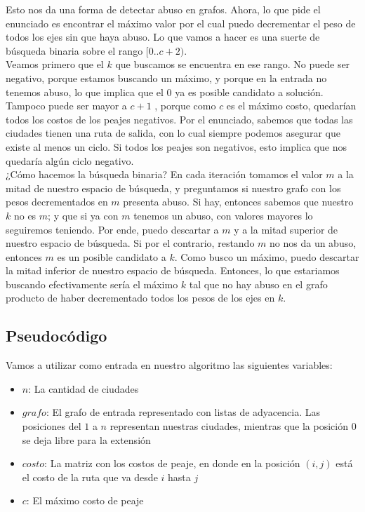 Esto nos da una forma de detectar abuso en grafos. Ahora, lo que pide el enunciado es encontrar el máximo valor por el cual puedo decrementar el peso de todos los ejes sin que haya abuso. Lo que vamos a hacer es una suerte de búsqueda binaria sobre el rango $[0..c+2)$. \\

Veamos primero que el $k$ que buscamos se encuentra en ese rango. No puede ser negativo, porque estamos buscando un máximo, y porque en la entrada no tenemos abuso, lo que implica que el $0$ ya es posible candidato a solución. Tampoco puede ser mayor a $c+1$ , porque como $c$ es el máximo costo, quedarían todos los costos de los peajes negativos. Por el enunciado, sabemos que todas las ciudades tienen una ruta de salida, con lo cual siempre podemos asegurar que existe al menos un ciclo. Si todos los peajes son negativos, esto implica que nos quedaría algún ciclo negativo. \\

¿Cómo hacemos la búsqueda binaria? En cada iteración tomamos el valor $m$ a la mitad de nuestro espacio de búsqueda, y preguntamos si nuestro grafo con los pesos decrementados en $m$ presenta abuso. Si hay, entonces sabemos que nuestro $k$ no es $m$; y que si ya con $m$ tenemos un abuso, con valores mayores lo seguiremos teniendo. Por ende, puedo descartar a $m$ y a la mitad superior de nuestro espacio de búsqueda. Si por el contrario, restando $m$ no nos da un abuso, entonces $m$ es un posible candidato a $k$. Como busco un máximo, puedo descartar la mitad inferior de nuestro espacio de búsqueda. Entonces, lo que estariamos buscando efectivamente sería el máximo $k$ tal que no hay abuso en el grafo producto de haber decrementado todos los pesos de los ejes en $k$. \\

\newpage
\subsection{Pseudocódigo}

Vamos a utilizar como entrada en nuestro algoritmo las siguientes variables:
\begin{itemize}
	\item $n$: La cantidad de ciudades
	\item $grafo$: El grafo de entrada representado con listas de adyacencia. Las posiciones del $1$ a $n$ representan nuestras ciudades, mientras que la posición $0$ se deja libre para la extensión
	\item $costo$: La matriz con los costos de peaje, en donde en la posición $(i,j)$ está el costo de la ruta que va desde $i$ hasta $j$
	\item $c$: El máximo costo de peaje
\end{itemize}


